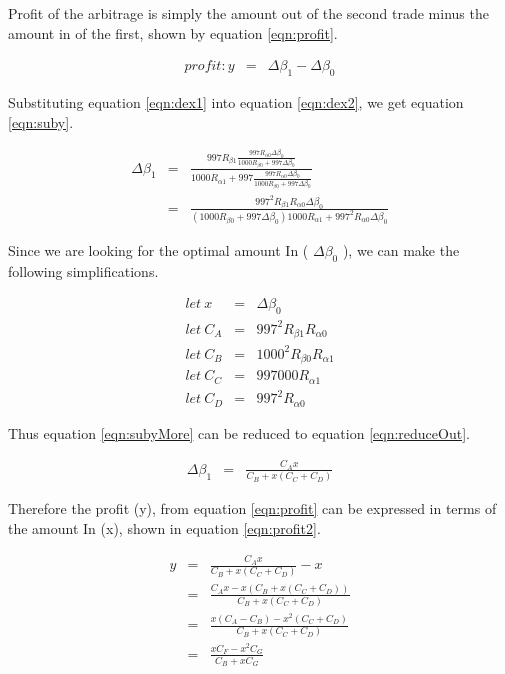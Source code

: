 \documentclass{article}
\begin{document}
Profit of the arbitrage is simply the amount out of the second trade minus the amount in of the first, shown by equation \ref{eqn:profit}.

\begin{eqnarray}
	profit: y  &=& \Delta\beta_{1} - \Delta\beta_{0} \label{eqn:profit}
\end{eqnarray}


Substituting equation \ref{eqn:dex1} into equation \ref{eqn:dex2}, we get equation \ref{eqn:suby}.

\begin{eqnarray}
	\Delta\beta_{1}  &=& \frac{997 R_{\beta 1} \frac{997 R_{\alpha 0} \Delta\beta_{0} }{1000 R_{\beta 0} + 997 \Delta\beta_{0}} }{1000 R_{\alpha 1} + 997 \frac{997 R_{\alpha 0} \Delta\beta_{0} }{1000 R_{\beta 0} + 997 \Delta\beta_{0}}} \label{eqn:suby}\\
	&=& \frac{997^2 R_{\beta 1}  R_{\alpha 0} \Delta\beta_{0} }{(1000 R_{\beta 0} + 997 \Delta\beta_{0}) 1000 R_{\alpha 1} + 997^2 R_{\alpha 0} \Delta\beta_{0} } \label{eqn:subyMore}
\end{eqnarray}

Since we are looking for the optimal amount In ( \(\Delta\beta_{0}\) ), we can make the following simplifications.

\begin{eqnarray}
	let \: x &=& \Delta\beta_{0}\\
	let \: C_{A} &=& 997^2 R_{\beta 1}  R_{\alpha 0}\\
	let \: C_{B} &=& 1000^2 R_{\beta 0} R_{\alpha 1}\\
	let \: C_{C} &=& 997000  R_{\alpha 1}\\
	let \: C_{D} &=& 997^2  R_{\alpha 0}
\end{eqnarray}

Thus equation \ref{eqn:subyMore} can be reduced to equation \ref{eqn:reduceOut}.

\begin{eqnarray}
	\Delta\beta_{1}  &=& \frac{C_{A} x}{C_{B} + x(C_{C} + C_{D})} \label{eqn:reduceOut}
\end{eqnarray}

Therefore the profit (y), from equation \ref{eqn:profit} can be expressed in terms of the amount In (x), shown in equation \ref{eqn:profit2}.

\begin{eqnarray}
	y  &=& \frac{C_{A} x}{C_{B} + x(C_{C} + C_{D})} - x \label{eqn:profit2}\\
	&=& \frac{C_{A} x - x(C_{B} + x(C_{C} + C_{D}))}{C_{B} + x(C_{C} + C_{D})} \label{eqn:profit3}\\
	&=& \frac{x(C_{A} - C_{B}) - x^2(C_{C} + C_{D})}{C_{B} + x(C_{C} + C_{D})} \label{eqn:profit4}\\
	&=& \frac{x C_{F} - x^2 C_{G} }{C_{B} + x C_{G}} \label{eqn:profit5}
\end{eqnarray}
\end{document}
